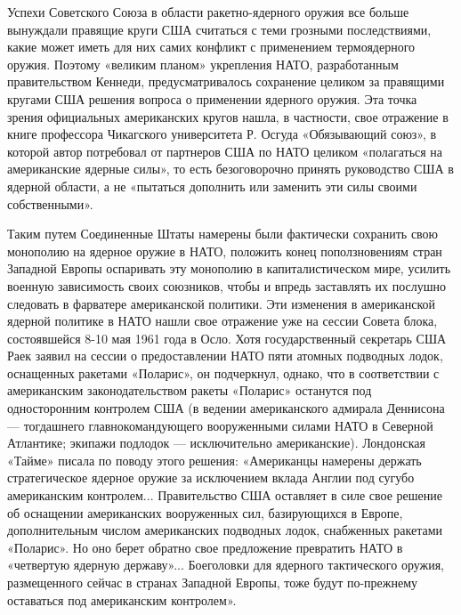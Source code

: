 \documentclass[12pt, a4paper, openany]{book}
\begin{document}
	Успехи Советского Союза в области ракетно-ядерного оружия все больше вынуждали правящие круги США считаться с теми грозными последствиями, какие может иметь для них самих конфликт с применением термоядерного оружия. Поэтому «великим планом» укрепления НАТО, разработанным правительством Кеннеди, предусматривалось сохранение целиком за правящими кругами США решения вопроса о применении ядерного оружия. Эта точка зрения официальных американских кругов нашла, в частности, свое отражение в книге профессора Чикагского университета Р. Осгуда «Обязывающий союз», в которой автор потребовал от партнеров США по НАТО целиком «полагаться на американские ядерные силы», то есть безоговорочно принять руководство США в ядерной области, а не «пытаться дополнить или заменить эти силы своими собственными».
	
	Таким путем Соединенные Штаты намерены были фактически сохранить свою монополию на ядерное оружие в НАТО, положить конец поползновениям стран Западной Европы оспаривать эту монополию в капиталистическом мире, усилить военную зависимость своих союзников, чтобы и впредь заставлять их послушно следовать в фарватере американской политики. Эти изменения в американской ядерной политике в НАТО нашли свое отражение уже на сессии Совета блока, состоявшейся 8-10 мая 1961 года в Осло. Хотя государственный секретарь США Раек заявил на сессии о предоставлении НАТО пяти атомных подводных лодок, оснащенных ракетами «Поларис», он подчеркнул, однако, что в соответствии с американским законодательством ракеты «Поларис» останутся под односторонним контролем США (в ведении американского адмирала Деннисона — тогдашнего главнокомандующего вооруженными силами НАТО в Северной Атлантике; экипажи подлодок — исключительно американские). Лондонская «Тайме» писала по поводу этого решения: «Американцы намерены держать стратегическое ядерное оружие за исключением вклада Англии под сугубо американским контролем... Правительство США оставляет в силе свое решение об оснащении американских вооруженных сил, базирующихся в Европе, дополнительным числом американских подводных лодок, снабженных ракетами «Поларис». Но оно берет обратно свое предложение превратить НАТО в «четвертую ядерную державу»... Боеголовки для ядерного тактического оружия, размещенного сейчас в странах Западной Европы, тоже будут по-прежнему оставаться под американским контролем».
	
\end{document}
